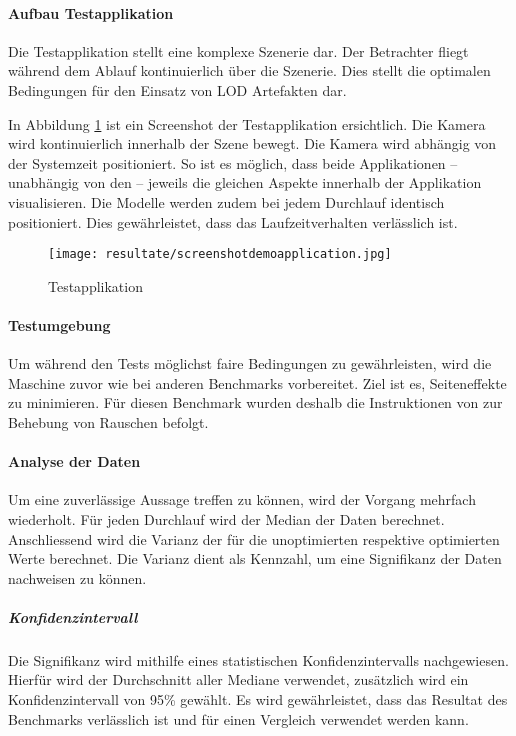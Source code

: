 \paragraph{Aufbau Testapplikation}
\label{chap:testApplication}
Die Testapplikation stellt eine komplexe Szenerie dar. Der Betrachter fliegt während dem Ablauf kontinuierlich über die Szenerie. Dies stellt die optimalen Bedingungen für den Einsatz von LOD Artefakten dar.

In Abbildung \ref{fig:demoApplication} ist ein Screenshot der Testapplikation ersichtlich. Die Kamera wird kontinuierlich innerhalb der Szene bewegt. Die Kamera wird abhängig von der Systemzeit positioniert. So ist es möglich, dass beide Applikationen – unabhängig von den  – jeweils die gleichen Aspekte innerhalb der Applikation visualisieren. Die Modelle werden zudem bei jedem Durchlauf identisch positioniert. Dies gewährleistet, dass das Laufzeitverhalten verlässlich ist.

\begin{figure}[H]
  \centering
  \texttt{[image: resultate/screenshotdemoapplication.jpg]}
  \caption{Testapplikation}
  \label{fig:demoApplication}
\end{figure}

\paragraph{Testumgebung}
Um während den Tests möglichst faire Bedingungen zu gewährleisten, wird die Maschine zuvor wie bei anderen Benchmarks vorbereitet. Ziel ist es, Seiteneffekte zu minimieren. Für diesen Benchmark wurden deshalb die Instruktionen von  zur Behebung von Rauschen befolgt.
\cite{tracerBenchNoiseMitigation}

\paragraph{Analyse der Daten}
Um eine zuverlässige Aussage treffen zu können, wird der Vorgang mehrfach wiederholt. Für jeden Durchlauf wird der Median der  Daten berechnet.
Anschliessend wird die Varianz der  für die unoptimierten respektive optimierten Werte berechnet. Die Varianz dient als Kennzahl, um eine Signifikanz der Daten nachweisen zu können.

\subparagraph{Konfidenzintervall}
Die Signifikanz wird mithilfe eines statistischen Konfidenzintervalls nachgewiesen. Hierfür wird der Durchschnitt aller Mediane verwendet, zusätzlich wird ein Konfidenzintervall von 95\% gewählt. Es wird gewährleistet, dass das Resultat des Benchmarks verlässlich ist und für einen Vergleich verwendet werden kann.

